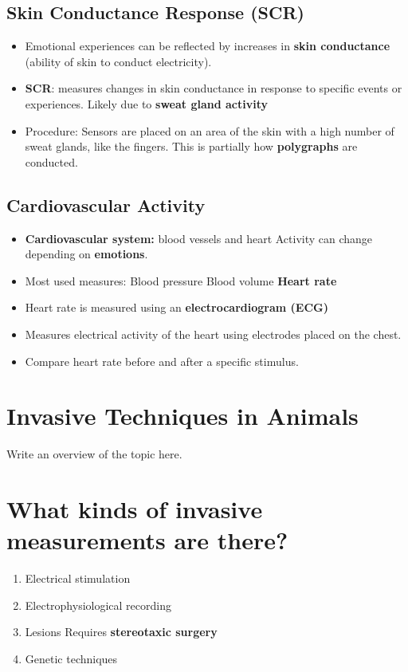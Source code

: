 \documentclass[12pt,a4paper]{article}
\begin{document}
	\subsection{Skin Conductance Response (SCR)}
	
	\begin{itemize}
		\item Emotional experiences can be reflected by increases in \textbf{skin conductance} (ability of skin to conduct electricity).
		\item \textbf{SCR}: measures changes in skin conductance in response to specific events or experiences. 
		\subitem Likely due to \textbf{sweat gland activity}
		\item Procedure: 
		\subitem Sensors are placed on an area of the skin with a high number of sweat glands, like the fingers. 
		\subitem This is partially how \textbf{polygraphs} are conducted. 
	\end{itemize}
	
	\subsection{Cardiovascular Activity}
	
	\begin{itemize}
		\item \textbf{Cardiovascular system:} blood vessels and heart
		\subitem Activity can change depending on \textbf{emotions}.
		\item Most used measures:
		\subitem Blood pressure 
		\subitem Blood volume 
		\subitem \textbf{Heart rate}
		\item Heart rate is measured using an \textbf{electrocardiogram (ECG)}
		\item Measures electrical activity of the heart using electrodes placed on the chest. 
		\item Compare heart rate before and after a specific stimulus.
	\end{itemize}
	
	\section*{Invasive Techniques in Animals}
	Write an overview of the topic here.
	
	\section{What kinds of invasive measurements are there?}
	\begin{enumerate}
		\item Electrical stimulation
		\item Electrophysiological recording 
		\item Lesions 
		\subitem Requires \textbf{stereotaxic surgery}
		\item Genetic techniques
	\end{enumerate}
	
\end{document}
